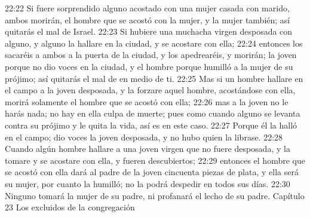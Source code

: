 22:22 Si fuere sorprendido alguno acostado con una mujer casada con marido, ambos morirán, el hombre que se acostó con la mujer, y la mujer también; así quitarás el mal de Israel.  
22:23 Si hubiere una muchacha virgen desposada con alguno, y alguno la hallare en la ciudad, y se acostare con ella;  
22:24 entonces los sacaréis a ambos a la puerta de la ciudad, y los apedrearéis, y morirán; la joven porque no dio voces en la ciudad, y el hombre porque humilló a la mujer de su prójimo; así quitarás el mal de en medio de ti.  
22:25 Mas si un hombre hallare en el campo a la joven desposada, y la forzare aquel hombre, acostándose con ella, morirá solamente el hombre que se acostó con ella;  
22:26 mas a la joven no le harás nada; no hay en ella culpa de muerte; pues como cuando alguno se levanta contra su prójimo y le quita la vida, así es en este caso.  
22:27 Porque él la halló en el campo; dio voces la joven desposada, y no hubo quien la librase.  
22:28 Cuando algún hombre hallare a una joven virgen que no fuere desposada, y la tomare y se acostare con ella, y fueren descubiertos;  
22:29 entonces el hombre que se acostó con ella dará al padre de la joven cincuenta piezas de plata, y ella será su mujer, por cuanto la humilló; no la podrá despedir en todos sus días. 
22:30 Ninguno tomará la mujer de su padre, ni profanará el lecho de su padre.  
Capítulo 23 
Los excluidos de la congregación  

